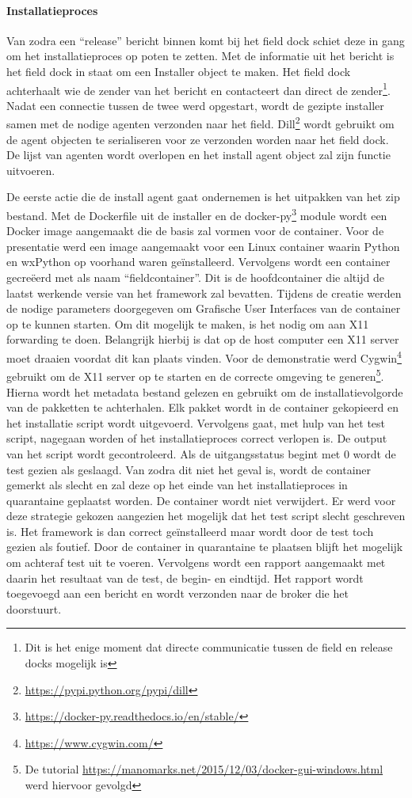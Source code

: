 \paragraph{Installatieproces}
Van zodra een ``release'' bericht binnen komt bij het field dock schiet deze in gang om het installatieproces op poten te zetten.
Met de informatie uit het bericht is het field dock in staat om een Installer object te maken.
Het field dock achterhaalt wie de zender van het bericht en contacteert dan direct de zender\footnote{Dit is het enige moment dat directe communicatie tussen de field en release docks mogelijk is}.
Nadat een connectie tussen de twee werd opgestart, wordt de gezipte installer samen met de nodige agenten verzonden naar het field.
Dill\footnote{\url{https://pypi.python.org/pypi/dill}} wordt gebruikt om de agent objecten te serialiseren voor ze verzonden worden naar het field dock.
De lijst van agenten wordt overlopen en het install agent object zal zijn functie uitvoeren.

De eerste actie die de install agent gaat ondernemen is het uitpakken van het zip bestand.
Met de Dockerfile uit de installer en de docker-py\footnote{\url{https://docker-py.readthedocs.io/en/stable/}} module wordt een Docker image aangemaakt die de basis zal vormen voor de container.
Voor de presentatie werd een image aangemaakt voor een Linux container waarin Python en wxPython op voorhand waren geïnstalleerd.
Vervolgens wordt een container gecreëerd met als naam ``fieldcontainer''.
Dit is de hoofdcontainer die altijd de laatst werkende versie van het framework zal bevatten.
Tijdens de creatie werden de nodige parameters doorgegeven om Grafische User Interfaces van de container op te kunnen starten.
Om dit mogelijk te maken, is het nodig om aan X11 forwarding te doen.
Belangrijk hierbij is dat op de host computer een X11 server moet draaien voordat dit kan plaats vinden.
Voor de demonstratie werd Cygwin\footnote{\url{https://www.cygwin.com/}} gebruikt om de X11 server op te starten en de correcte omgeving te generen\footnote{De tutorial \url{https://manomarks.net/2015/12/03/docker-gui-windows.html} werd hiervoor gevolgd}.
Hierna wordt het metadata bestand gelezen en gebruikt om de installatievolgorde van de pakketten te achterhalen.
Elk pakket wordt in de container gekopieerd en het installatie script wordt uitgevoerd.
Vervolgens gaat, met hulp van het test script, nagegaan worden of het installatieproces correct verlopen is.
De output van het script wordt gecontroleerd.
Als de uitgangsstatus begint met 0 wordt de test gezien als geslaagd.
Van zodra dit niet het geval is, wordt de container gemerkt als slecht en zal deze op het einde van het installatieproces in quarantaine geplaatst worden.
De container wordt niet verwijdert. 
Er werd voor deze strategie gekozen aangezien het mogelijk dat het test script slecht geschreven is.
Het framework is dan correct geïnstalleerd maar wordt door de test toch gezien als foutief.
Door de container in quarantaine te plaatsen blijft het mogelijk om achteraf test uit te voeren.
Vervolgens wordt een rapport aangemaakt met daarin het resultaat van de test, de begin- en eindtijd.
Het rapport wordt toegevoegd aan een bericht en wordt verzonden naar de broker die het doorstuurt.

